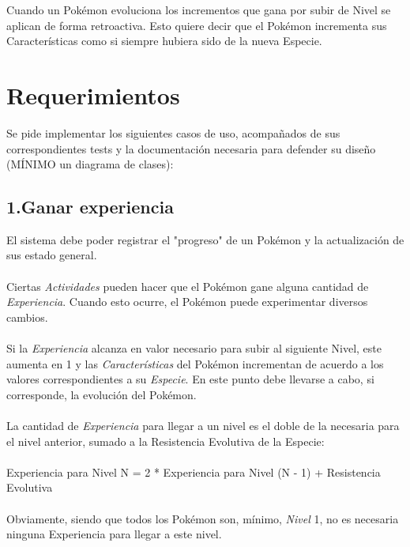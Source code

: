 \documentclass[spanish,a4paper]{article}
\begin{document}
Cuando un Pokémon evoluciona los incrementos que gana por subir de Nivel se aplican de forma retroactiva. Esto quiere decir que el Pokémon incrementa sus Características como si siempre hubiera sido de la nueva Especie.

\section{Requerimientos}

Se pide implementar los siguientes casos de uso, acompañados de sus correspondientes tests y la documentación necesaria para defender su diseño (MÍNIMO un diagrama de clases):

\subsection*{1.Ganar experiencia}

El sistema debe poder registrar el "progreso" de un Pokémon y la actualización de sus estado general.
\\\\
Ciertas \textit{Actividades} pueden hacer que el Pokémon gane alguna cantidad de \textit{Experiencia}. Cuando esto ocurre, el Pokémon puede experimentar diversos cambios.
\\\\
Si la \textit{Experiencia} alcanza en valor necesario para subir al siguiente Nivel, este aumenta en 1 y las \textit{Características} del Pokémon incrementan de acuerdo a los valores correspondientes a su \textit{Especie}.
En este punto debe llevarse a cabo, si corresponde, la evolución del Pokémon.
\\\\
La cantidad de \textit{Experiencia} para llegar a un nivel es el doble de la necesaria para el nivel anterior, sumado a la Resistencia Evolutiva de la Especie:
\\\\
Experiencia para Nivel N = 2 * Experiencia para Nivel (N - 1) + Resistencia Evolutiva
\\\\
Obviamente, siendo que todos los Pokémon son, mínimo, \textit{Nivel} 1, no es necesaria ninguna Experiencia para llegar a este nivel.

\end{document}
